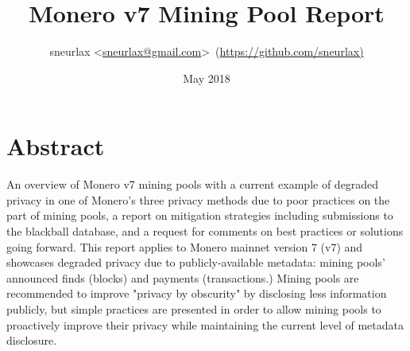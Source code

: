 \documentclass{report}
\title{Monero v7 Mining Pool Report}
\date{May 2018}
\author{sneurlax \textless\url{sneurlax@gmail.com}\textgreater \ (\url{https://github.com/sneurlax)}}
\begin{document}
\maketitle

\section*{Abstract}

An overview of Monero v7 mining pools with a current example of degraded privacy in one of Monero's three privacy methods due to poor practices on the part of mining pools, a report on mitigation strategies including submissions to the blackball database, and a request for comments on best practices or solutions going forward.  This report applies to Monero mainnet version 7 (v7) and showcases degraded privacy due to publicly-available metadata: mining pools' announced finds (blocks) and payments (transactions.)  Mining pools are recommended to improve "privacy by obscurity" by disclosing less information publicly, but simple practices are presented in order to allow mining pools to proactively improve their privacy while maintaining the current level of metadata disclosure.

\end{document}

